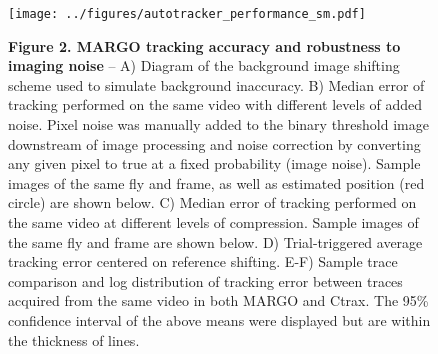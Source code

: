 \documentclass[10pt]{article}
\begin{document}
\newpage
\begin{figure}[h!]
	\begin{center}
		\texttt{[image: ../figures/autotracker\_performance\_sm.pdf]}
	\end{center}
	\caption*{\footnotesize \textbf{Figure 2. MARGO tracking accuracy and robustness to imaging noise} -- A) Diagram of the background image shifting scheme used to simulate background inaccuracy. B) Median error of tracking performed on the same video with different levels of added noise. Pixel noise was manually added to the binary threshold image downstream of image processing and noise correction by converting any given pixel to true at a fixed probability (image noise). Sample images of the same fly and frame, as well as estimated position (red circle) are shown below. C) Median error of tracking performed on the same video at different levels of compression. Sample images of the same fly and frame are shown below. D) Trial-triggered average tracking error centered on reference shifting. E-F) Sample trace comparison and log distribution of tracking error between traces acquired from the same video in both MARGO and Ctrax. The 95\% confidence interval of the above means were displayed but are within the thickness of lines.}
\end{figure}
\end{document}
